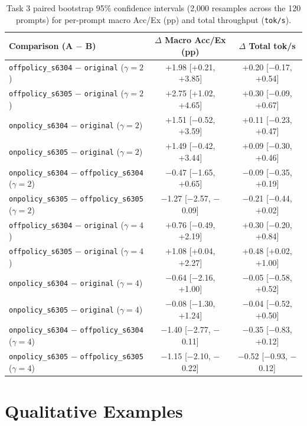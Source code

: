 \documentclass{article}
\begin{document}
\begin{table}[H]
\centering\footnotesize
\caption{Task 3 paired bootstrap 95\% confidence intervals (2,000 resamples across the 120 prompts) for per-prompt macro Acc/Ex (pp) and total throughput (\texttt{tok/s}).}
\label{tab:t3ci}
\begin{tabular}{lcc}
\toprule
Comparison (A $-$ B) & $\Delta$ Macro Acc/Ex (pp) & $\Delta$ Total tok/s \\
\midrule
\texttt{offpolicy\_s6304} $-$ \texttt{original} ($\gamma=2$) & +1.98 [+0.21, +3.85] & +0.20 [$-$0.17, +0.54] \\
\texttt{offpolicy\_s6305} $-$ \texttt{original} ($\gamma=2$) & +2.75 [+1.02, +4.65] & +0.30 [$-$0.09, +0.67] \\
\texttt{onpolicy\_s6304} $-$ \texttt{original} ($\gamma=2$) & +1.51 [$-$0.52, +3.59] & +0.11 [$-$0.23, +0.47] \\
\texttt{onpolicy\_s6305} $-$ \texttt{original} ($\gamma=2$) & +1.49 [$-$0.42, +3.44] & +0.09 [$-$0.30, +0.46] \\
\texttt{onpolicy\_s6304} $-$ \texttt{offpolicy\_s6304} ($\gamma=2$) & $-$0.47 [$-$1.65, +0.65] & $-$0.09 [$-$0.35, +0.19] \\
\texttt{onpolicy\_s6305} $-$ \texttt{offpolicy\_s6305} ($\gamma=2$) & $-$1.27 [$-$2.57, $-$0.09] & $-$0.21 [$-$0.44, +0.02] \\
\midrule
\texttt{offpolicy\_s6304} $-$ \texttt{original} ($\gamma=4$) & +0.76 [$-$0.49, +2.19] & +0.30 [$-$0.20, +0.84] \\
\texttt{offpolicy\_s6305} $-$ \texttt{original} ($\gamma=4$) & +1.08 [+0.04, +2.27] & +0.48 [+0.02, +1.00] \\
\texttt{onpolicy\_s6304} $-$ \texttt{original} ($\gamma=4$) & $-$0.64 [$-$2.16, +1.00] & $-$0.05 [$-$0.58, +0.52] \\
\texttt{onpolicy\_s6305} $-$ \texttt{original} ($\gamma=4$) & $-$0.08 [$-$1.30, +1.24] & $-$0.04 [$-$0.52, +0.50] \\
\texttt{onpolicy\_s6304} $-$ \texttt{offpolicy\_s6304} ($\gamma=4$) & $-$1.40 [$-$2.77, $-$0.11] & $-$0.35 [$-$0.83, +0.12] \\
\texttt{onpolicy\_s6305} $-$ \texttt{offpolicy\_s6305} ($\gamma=4$) & $-$1.15 [$-$2.10, $-$0.22] & $-$0.52 [$-$0.93, $-$0.12] \\
\bottomrule
\end{tabular}
\end{table}

\section{Qualitative Examples}
\label{app:qual}
\end{document}
